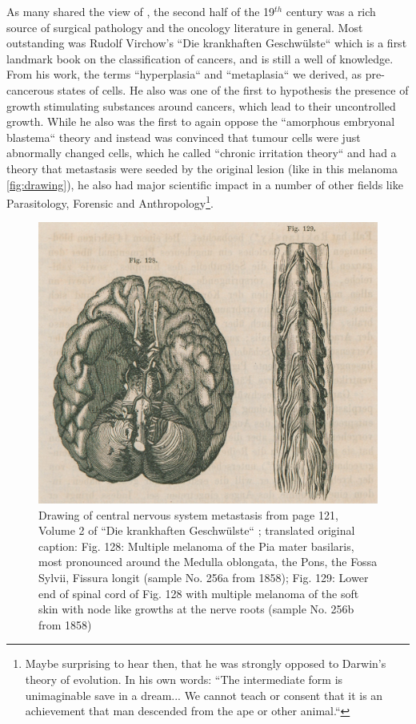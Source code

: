 As many shared the view of \citeauthor{Bennett1849}, the second half of the 19$^{th}$ century was a rich source of surgical pathology and the oncology literature in general. Most outstanding was Rudolf Virchow's ``Die krankhaften Geschw\"ulste`` \cite{Virchow1863} which is a first landmark book on the classification of cancers, and is still a well of knowledge. From his work, the terms ``hyperplasia`` and ``metaplasia``  we derived, as pre-cancerous states of cells. He also was one of the first to hypothesis the presence of growth stimulating substances around cancers, which lead to their uncontrolled growth. While he also was the first to again oppose the ``amorphous embryonal blastema`` theory and instead was convinced that tumour cells were just abnormally changed cells, which he called ``chronic irritation theory`` and had a theory that metastasis were seeded by the original lesion (like in this melanoma \autoref{fig:drawing}), he also had major scientific impact in a number of other fields like Parasitology, Forensic and Anthropology\footnote{Maybe surprising to hear then, that he was strongly opposed to Darwin's theory of evolution. In his own words: ``The intermediate form is unimaginable save in a dream... We cannot teach or consent that it is an achievement that man descended from the ape or other animal.``}.

\begin{figure}[!ht]
\centering
\includegraphics[width=.95\linewidth]{Figures/drawingMelaMeta}
\caption[Drawing of central nervous system metastasis]{Drawing of central nervous system metastasis from page 121, Volume 2 of ``Die krankhaften Geschw\"ulste`` \protect\textcite{Virchow1863}; translated original caption: Fig. 128: Multiple melanoma of the Pia mater basilaris, most pronounced around the Medulla oblongata, the Pons, the Fossa Sylvii, Fissura longit (sample No. 256a from 1858); Fig. 129: Lower end of spinal cord of Fig. 128 with multiple melanoma of the soft skin with node like growths at the nerve roots (sample No. 256b from 1858)}\label{fig:drawing}
\end{figure}

